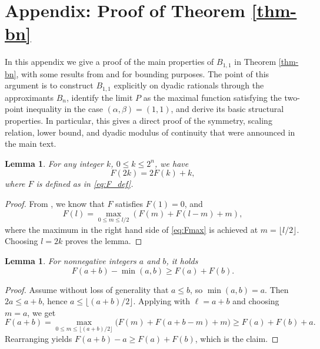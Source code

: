 \documentclass[11pt]{amsart}
\newtheorem{lemma}[theorem]{Lemma}
\theoremstyle{definition}
\renewcommand{\1}{{\mathbbm{1}}}
\begin{document}
\appendix
\section{Appendix: Proof of Theorem \ref{thm-bn}}
In this appendix we give a proof of the main
properties of $B_{1,1}$ in Theorem \ref{thm-bn}, with some results from \cite{hart} and \cite{BIM} for bounding purposes.
The point of this argument is to construct $B_{1,1}$ explicitly on dyadic rationals through the approximants $B_n$, identify the limit $P$ as the maximal function satisfying the two-point inequality in the case $(\alpha,\beta)=(1,1)$, and derive its basic structural properties. In particular, this gives a direct proof of the symmetry, scaling relation, lower bound, and dyadic modulus of continuity that were announced in the main text. 


\begin{lemma}\label{lm:F1}
    For any integer $k$,  $0\leq k\leq 2^n$, we have 
    \[
    F(2k)=2F(k)+k,
    \]
    where $F$ is defined as in \eqref{eq:F_def}. 
\end{lemma}
\begin{proof}
    From {\cite[Remark 2.5]{hart}}, we know that $F$ satisfies $F(1)=0$, and 
    \begin{equation}
    \label{eq:Fmax}
        F(l) = \max_{0\leq m\leq l/2} (F(m)+F(l-m)+m),
    \end{equation}
    where the maximum in the right hand side of \eqref{eq:Fmax} is achieved at $m=\lfloor l/2\rfloor$. Choosing $l=2k$ proves the lemma. 

\end{proof}

\begin{lemma}\label{lm:F2}
For nonnegative integers $a$ and $b$, it holds
\[
F(a+b) -\min(a,b) \geq F(a) + F(b) .
\]
\end{lemma}


\begin{proof}
Assume without loss of generality that $a\le b$, so $\min(a,b)=a$.
Then $2a\le a+b$, hence $a\le \lfloor (a+b)/2\rfloor$.
Applying {\cite[Proposition 2.1]{hart}} with $\ell=a+b$ and choosing $m=a$, we get
\[
F(a+b)=\max_{0\le m\le \lfloor (a+b)/2\rfloor}\bigl(F(m)+F(a+b-m)+m\bigr)
\ge F(a)+F(b)+a.
\]
Rearranging yields $F(a+b)-a\ge F(a)+F(b)$, which is the claim.
\end{proof}
\end{document}
